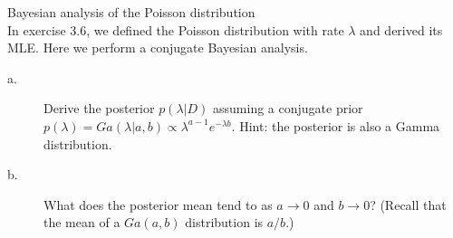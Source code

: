 \documentclass[a4paper,twoside=false,abstract=false,numbers=noenddot,
titlepage=false,headings=small,parskip=half,version=last]{scrartcl}
\begin{document}
\begin{exercise}{3.7} Bayesian analysis of the Poisson distribution \\
    In exercise 3.6, we defined the Poisson distribution with rate $\lambda$
    and derived its MLE. Here we perform a conjugate Bayesian analysis. 
    \begin{description}
        \item[a.] Derive the posterior $p(\lambda|D)$ assuming a conjugate
            prior $p(\lambda)=Ga(\lambda|a,b)\propto
            \lambda^{a-1}e^{-\lambda b}$. Hint: the posterior is also a Gamma
            distribution. 
        \item[b.] What does the posterior mean tend to as $a\rightarrow 0$ and
            $b\rightarrow 0$? (Recall that the mean of a $Ga(a,b)$ distribution
            is $a/b$.)
    \end{description}
\end{exercise}
\begin{solution}

\end{solution}

\end{document}
